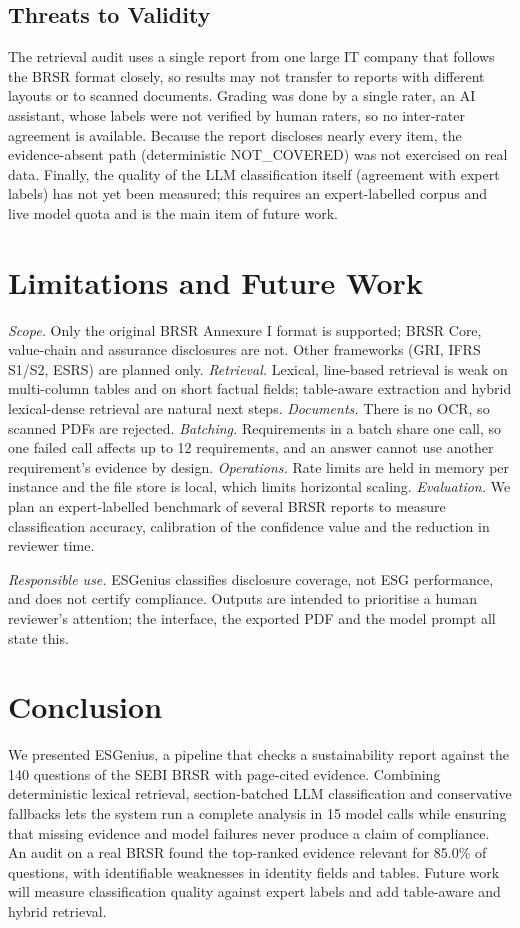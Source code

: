\documentclass[conference]{IEEEtran}
\begin{document}
\subsection{Threats to Validity}
The retrieval audit uses a single report from one large IT company that follows the BRSR format closely, so results may not transfer to reports with different layouts or to scanned documents. Grading was done by a single rater, an AI assistant, whose labels were not verified by human raters, so no inter-rater agreement is available. Because the report discloses nearly every item, the evidence-absent path (deterministic NOT\_COVERED) was not exercised on real data. Finally, the quality of the LLM classification itself (agreement with expert labels) has not yet been measured; this requires an expert-labelled corpus and live model quota and is the main item of future work.

\section{Limitations and Future Work}
\textit{Scope.} Only the original BRSR Annexure I format is supported; BRSR Core, value-chain and assurance disclosures are not. Other frameworks (GRI, IFRS S1/S2, ESRS) are planned only. \textit{Retrieval.} Lexical, line-based retrieval is weak on multi-column tables and on short factual fields; table-aware extraction and hybrid lexical-dense retrieval are natural next steps. \textit{Documents.} There is no OCR, so scanned PDFs are rejected. \textit{Batching.} Requirements in a batch share one call, so one failed call affects up to 12 requirements, and an answer cannot use another requirement's evidence by design. \textit{Operations.} Rate limits are held in memory per instance and the file store is local, which limits horizontal scaling. \textit{Evaluation.} We plan an expert-labelled benchmark of several BRSR reports to measure classification accuracy, calibration of the confidence value and the reduction in reviewer time.

\textit{Responsible use.} ESGenius classifies disclosure coverage, not ESG performance, and does not certify compliance. Outputs are intended to prioritise a human reviewer's attention; the interface, the exported PDF and the model prompt all state this.

\section{Conclusion}
We presented ESGenius, a pipeline that checks a sustainability report against the 140 questions of the SEBI BRSR with page-cited evidence. Combining deterministic lexical retrieval, section-batched LLM classification and conservative fallbacks lets the system run a complete analysis in 15 model calls while ensuring that missing evidence and model failures never produce a claim of compliance. An audit on a real BRSR found the top-ranked evidence relevant for 85.0\% of questions, with identifiable weaknesses in identity fields and tables. Future work will measure classification quality against expert labels and add table-aware and hybrid retrieval.
\end{document}
